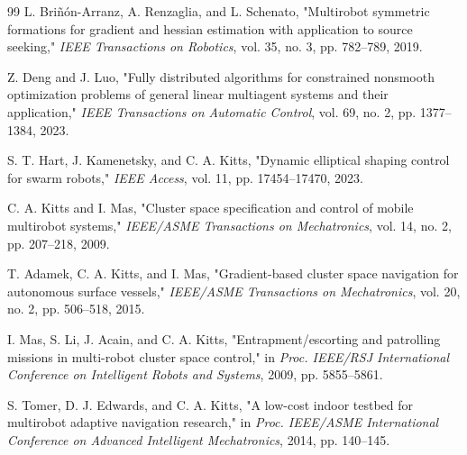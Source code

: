 \documentclass[lettersize,journal]{IEEEtran}
\begin{document}
\begin{thebibliography}{99}
 L. Briñón-Arranz, A. Renzaglia, and L. Schenato, "Multirobot symmetric formations for gradient and hessian estimation with application to source seeking," \textit{IEEE Transactions on Robotics}, vol. 35, no. 3, pp. 782--789, 2019.

 Z. Deng and J. Luo, "Fully distributed algorithms for constrained nonsmooth optimization problems of general linear multiagent systems and their application," \textit{IEEE Transactions on Automatic Control}, vol. 69, no. 2, pp. 1377--1384, 2023.

 S. T. Hart, J. Kamenetsky, and C. A. Kitts, "Dynamic elliptical shaping control for swarm robots," \textit{IEEE Access}, vol. 11, pp. 17454--17470, 2023.

 C. A. Kitts and I. Mas, "Cluster space specification and control of mobile multirobot systems," \textit{IEEE/ASME Transactions on Mechatronics}, vol. 14, no. 2, pp. 207--218, 2009.

 T. Adamek, C. A. Kitts, and I. Mas, "Gradient-based cluster space navigation for autonomous surface vessels," \textit{IEEE/ASME Transactions on Mechatronics}, vol. 20, no. 2, pp. 506--518, 2015.

 I. Mas, S. Li, J. Acain, and C. A. Kitts, "Entrapment/escorting and patrolling missions in multi-robot cluster space control," in \textit{Proc. IEEE/RSJ International Conference on Intelligent Robots and Systems}, 2009, pp. 5855--5861.

 S. Tomer, D. J. Edwards, and C. A. Kitts, "A low-cost indoor testbed for multirobot adaptive navigation research," in \textit{Proc. IEEE/ASME International Conference on Advanced Intelligent Mechatronics}, 2014, pp. 140--145.

\end{thebibliography}
\end{document}
